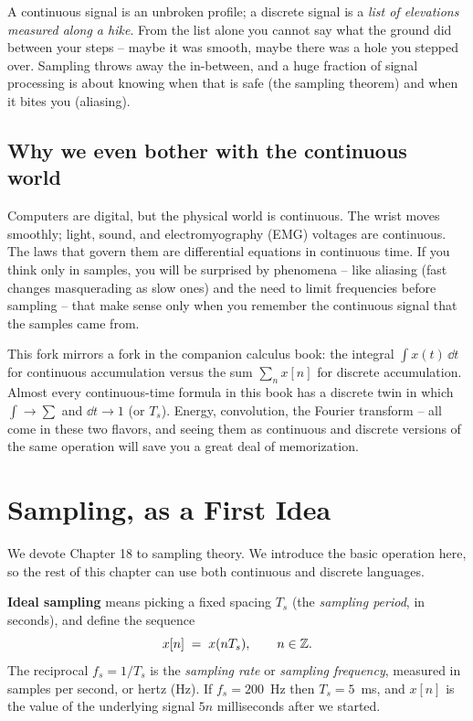 \begin{intuitionbox}
A continuous signal is an unbroken profile; a discrete signal is a \emph{list of
elevations measured along a hike}. From the list alone you cannot say what the
ground did between your steps -- maybe it was smooth, maybe there was a hole you
stepped over. Sampling throws away the in-between, and a huge fraction of signal
processing is about knowing when that is safe (the sampling theorem) and when it
bites you (aliasing).
\end{intuitionbox}

\subsection*{Why we even bother with the continuous world}

Computers are digital, but the physical world is continuous. The wrist moves smoothly; light, sound, and electromyography (EMG)
voltages are continuous. The laws that govern them are differential equations in continuous time. If you think only in samples, you
will be surprised by phenomena -- like aliasing (fast changes masquerading as slow ones) and the need to limit frequencies before sampling -- that make
sense only when you remember the continuous signal that the samples came from.

\begin{connectionbox}
This fork mirrors a fork in the companion calculus book: the integral
$\int x(t)\,\dd t$ for continuous accumulation versus the sum $\sum_n x[n]$ for
discrete accumulation. Almost every continuous-time formula in this book has a
discrete twin in which $\int \to \sum$ and $\dd t \to 1$ (or $T_s$). Energy,
convolution, the Fourier transform -- all come in these two flavors, and seeing
them as continuous and discrete versions of the same operation will save you a
great deal of memorization.
\end{connectionbox}

\section{Sampling, as a First Idea}
\label{ch02:sampling}

We devote Chapter 18 to sampling theory. We introduce the basic operation here, so the rest of this
chapter can use both continuous and discrete languages.

\textbf{Ideal sampling} means picking a fixed spacing $T_s$ (the \emph{sampling
period}, in seconds), and define the sequence
\[
  x[n] \;=\; x(nT_s), \qquad n \in \mathbb{Z} .
\]
The reciprocal $f_s = 1/T_s$ is the \emph{sampling rate} or \emph{sampling
frequency}, measured in samples per second, or hertz (Hz). If $f_s = 200$~Hz then
$T_s = 5$~ms, and $x[n]$ is the value of the underlying signal $5n$ milliseconds
after we started.

